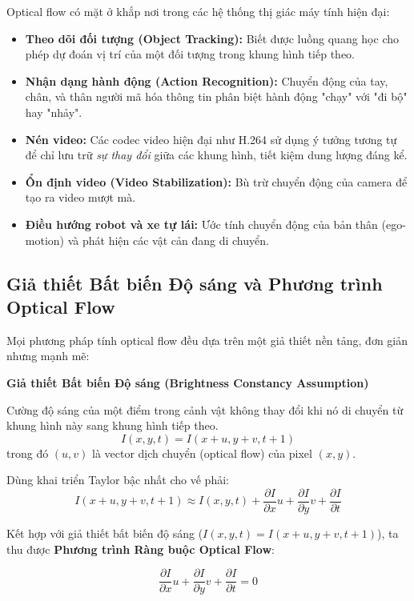 Optical flow có mặt ở khắp nơi trong các hệ thống thị giác máy tính hiện đại:
\begin{itemize}
    \item \textbf{Theo dõi đối tượng (Object Tracking):} Biết được luồng quang học cho phép dự đoán vị trí của một đối tượng trong khung hình tiếp theo.
    \item \textbf{Nhận dạng hành động (Action Recognition):} Chuyển động của tay, chân, và thân người mã hóa thông tin phân biệt hành động "chạy" với "đi bộ" hay "nhảy".
    \item \textbf{Nén video:} Các codec video hiện đại như H.264 sử dụng ý tưởng tương tự để chỉ lưu trữ \textit{sự thay đổi} giữa các khung hình, tiết kiệm dung lượng đáng kể.
    \item \textbf{Ổn định video (Video Stabilization):} Bù trừ chuyển động của camera để tạo ra video mượt mà.
    \item \textbf{Điều hướng robot và xe tự lái:} Ước tính chuyển động của bản thân (ego-motion) và phát hiện các vật cản đang di chuyển.
\end{itemize}

\subsection{Giả thiết Bất biến Độ sáng và Phương trình Optical Flow}
\label{subsec:brightness_constancy}

Mọi phương pháp tính optical flow đều dựa trên một giả thiết nền tảng, đơn giản nhưng mạnh mẽ:

\begin{mdframed}[style=infobox]
    \textbf{Giả thiết Bất biến Độ sáng (Brightness Constancy Assumption)}

    Cường độ sáng của một điểm trong cảnh vật không thay đổi khi nó di chuyển từ khung hình này sang khung hình tiếp theo.
    \[
        I(x, y, t) = I(x + u, y + v, t + 1)
    \]
    trong đó $(u, v)$ là vector dịch chuyển (optical flow) của pixel $(x, y)$.
\end{mdframed}

Dùng khai triển Taylor bậc nhất cho vế phải:
\[
    I(x + u, y + v, t + 1) \approx I(x, y, t) + \frac{\partial I}{\partial x}u + \frac{\partial I}{\partial y}v + \frac{\partial I}{\partial t}
\]

Kết hợp với giả thiết bất biến độ sáng ($I(x,y,t) = I(x+u,y+v,t+1)$), ta thu được \textbf{Phương trình Ràng buộc Optical Flow}:

\begin{equation}
    \frac{\partial I}{\partial x}u + \frac{\partial I}{\partial y}v + \frac{\partial I}{\partial t} = 0
    \label{eq:optical_flow_constraint}
\end{equation}

